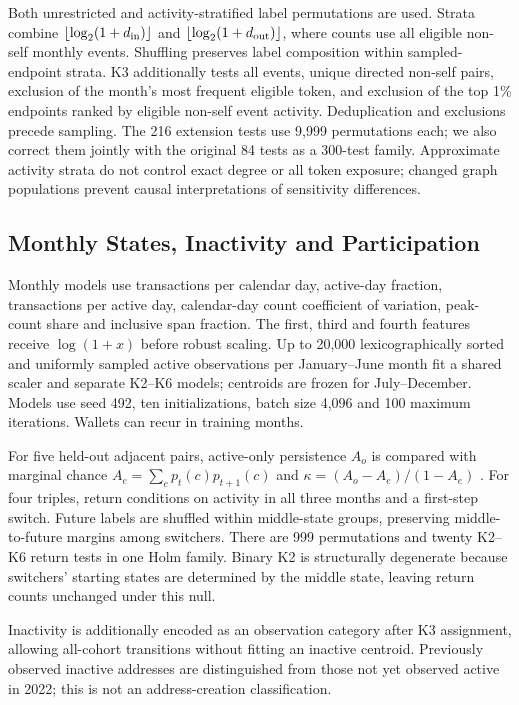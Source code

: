 \documentclass[journal,letterpaper]{IEEEtran}
\begin{document}
Both unrestricted and activity-stratified label permutations are used. Strata combine $\lfloor\log_2(1+d_{\rm in})\rfloor$ and $\lfloor\log_2(1+d_{\rm out})\rfloor$, where counts use all eligible non-self monthly events. Shuffling preserves label composition within sampled-endpoint strata. K3 additionally tests all events, unique directed non-self pairs, exclusion of the month's most frequent eligible token, and exclusion of the top 1\% endpoints ranked by eligible non-self event activity. Deduplication and exclusions precede sampling. The 216 extension tests use 9,999 permutations each; we also correct them jointly with the original 84 tests as a 300-test family. Approximate activity strata do not control exact degree or all token exposure; changed graph populations prevent causal interpretations of sensitivity differences.

\subsection{Monthly States, Inactivity and Participation}
Monthly models use transactions per calendar day, active-day fraction, transactions per active day, calendar-day count coefficient of variation, peak-count share and inclusive span fraction. The first, third and fourth features receive $\log(1+x)$ before robust scaling. Up to 20,000 lexicographically sorted and uniformly sampled active observations per January--June month fit a shared scaler and separate K2--K6 models; centroids are frozen for July--December. Models use seed 492, ten initializations, batch size 4,096 and 100 maximum iterations. Wallets can recur in training months.

For five held-out adjacent pairs, active-only persistence $A_o$ is compared with marginal chance $A_e=\sum_c p_t(c)p_{t+1}(c)$ and $\kappa=(A_o-A_e)/(1-A_e)$ \cite{cohen1960agreement}. For four triples, return conditions on activity in all three months and a first-step switch. Future labels are shuffled within middle-state groups, preserving middle-to-future margins among switchers. There are 999 permutations and twenty K2--K6 return tests in one Holm family. Binary K2 is structurally degenerate because switchers' starting states are determined by the middle state, leaving return counts unchanged under this null.

Inactivity is additionally encoded as an observation category after K3 assignment, allowing all-cohort transitions without fitting an inactive centroid. Previously observed inactive addresses are distinguished from those not yet observed active in 2022; this is not an address-creation classification.
\end{document}
